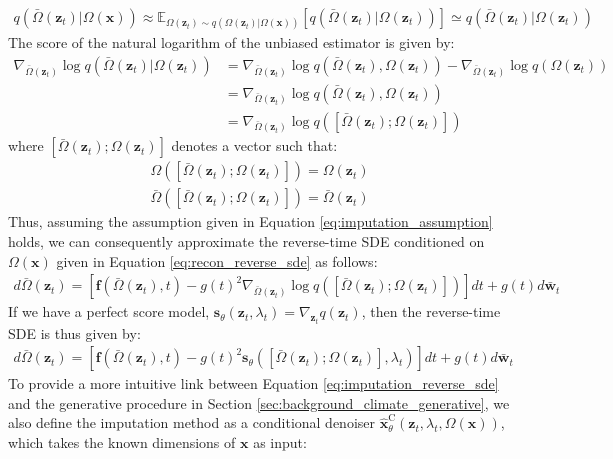 \documentclass[ oneside,%
                    author={George Herbert},
                    degree={MSci},
                     title={Video Diffusion Models for Climate Simulations},
                  subtitle={}]{dissertation}
\begin{document}
\begin{align}
      q(\bar\Omega(\mathbf{z}_t)|\Omega(\mathbf{x})) \approx \mathbb{E}_{\Omega(\mathbf{z}_t)\sim q(\Omega(\mathbf{z}_t)|\Omega(\mathbf{x}))}\left[q(\bar\Omega(\mathbf{z}_t)| \Omega(\mathbf{z}_t))\right] \simeq q(\bar\Omega(\mathbf{z}_t)| \Omega(\mathbf{z}_t))
\end{align}
The score of the natural logarithm of the unbiased estimator is given by:
\begin{align}
      \nabla_{\bar\Omega(\mathbf{z}_t)} \log q(\bar\Omega(\mathbf{z}_t)| \Omega(\mathbf{z}_t))&=\nabla_{\bar\Omega(\mathbf{z}_t)} \log q(\bar\Omega(\mathbf{z}_t), \Omega(\mathbf{z}_t)) - \nabla_{\bar\Omega(\mathbf{z}_t)} \log q(\Omega(\mathbf{z}_t))\\
      &=\nabla_{\bar\Omega(\mathbf{z}_t)} \log q(\bar\Omega(\mathbf{z}_t), \Omega(\mathbf{z}_t))\\
      &=\nabla_{\bar\Omega(\mathbf{z}_t)} \log q([\bar\Omega(\mathbf{z}_t); \Omega(\mathbf{z}_t)])
\end{align}
where $[\bar\Omega(\mathbf{z}_t); \Omega(\mathbf{z}_t)]$ denotes a vector such that:
\begin{align}
      \Omega([\bar\Omega(\mathbf{z}_t); \Omega(\mathbf{z}_t)]) = \Omega(\mathbf{z}_t)\\
      \bar\Omega([\bar\Omega(\mathbf{z}_t); \Omega(\mathbf{z}_t)]) = \bar\Omega(\mathbf{z}_t)
\end{align}
Thus, assuming the assumption given in Equation \ref{eq:imputation_assumption} holds, we can consequently approximate the reverse-time SDE conditioned on $\Omega(\mathbf{x})$ given in Equation \ref{eq:recon_reverse_sde} as follows:
\begin{align}
      d\bar\Omega(\mathbf{z}_t)=\left[\mathbf{f}(\bar\Omega(\mathbf{z}_t), t) - g(t)^2\nabla_{\bar\Omega(\mathbf{z}_t)}\log q([\bar\Omega(\mathbf{z}_t); \Omega(\mathbf{z}_t)])\right]dt + g(t)d \bar{\mathbf{w}}_t
\end{align}
If we have a perfect score model, $\mathbf{s}_\theta(\mathbf{z}_t, \lambda_t)=\nabla_{\mathbf{z}_t} q(\mathbf{z}_t)$, then the reverse-time SDE is thus given by:
\begin{align}
      d\bar\Omega(\mathbf{z}_t)=\left[\mathbf{f}(\bar\Omega(\mathbf{z}_t), t) - g(t)^2 \mathbf{s}_\theta([\bar\Omega(\mathbf{z}_t); \Omega(\mathbf{z}_t)], \lambda_t)\right]dt + g(t)d \bar{\mathbf{w}}_t\label{eq:imputation_reverse_sde}
\end{align}
To provide a more intuitive link between Equation \ref{eq:imputation_reverse_sde} and the generative procedure in Section \ref{sec:background_climate_generative}, we also define the imputation method as a conditional denoiser $\hat{\mathbf{x}}^{\mathrm{C}}_\theta(\mathbf{z}_t, \lambda_t, \Omega(\mathbf{x}))$, which takes the known dimensions of $\mathbf{x}$ as input:
\end{document}
